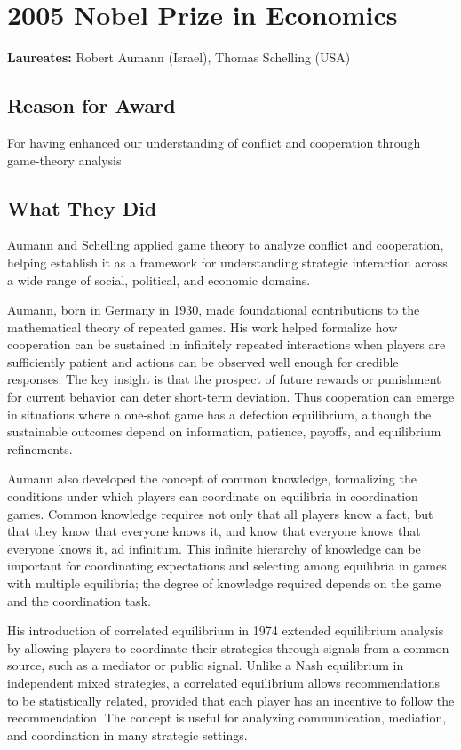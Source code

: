 \chapter{2005 Nobel Prize in Economics}
\textbf{Laureates: }Robert Aumann (Israel), Thomas Schelling (USA)

\section*{Reason for Award}
For having enhanced our understanding of conflict and cooperation through
game-theory analysis

\section{What They Did}
Aumann and Schelling applied game theory to analyze conflict and cooperation,
helping establish it as a framework for understanding strategic interaction
across a wide range of social, political, and economic domains.

Aumann, born in Germany in 1930, made foundational contributions to the
mathematical theory of repeated games. His work helped formalize how cooperation
can be sustained in infinitely repeated interactions when players are
sufficiently patient and actions can be observed well enough for credible
responses. The key insight is that the prospect of future rewards or punishment
for current behavior can deter short-term deviation. Thus cooperation can emerge
in situations where a one-shot game has a defection equilibrium, although the
sustainable outcomes depend on information, patience, payoffs, and equilibrium
refinements.

Aumann also developed the concept of common knowledge, formalizing the
conditions under which players can coordinate on equilibria in coordination
games. Common knowledge requires not only that all players know a fact, but
that they know that everyone knows it, and know that everyone knows that
everyone knows it, ad infinitum. This infinite hierarchy of knowledge can be
important for coordinating expectations and selecting among equilibria in
games with multiple equilibria; the degree of knowledge required depends on the
game and the coordination task.

His introduction of correlated equilibrium in 1974 extended equilibrium analysis
by allowing players to coordinate their strategies through signals from a common
source, such as a mediator or public signal. Unlike a Nash equilibrium in
independent mixed strategies, a correlated equilibrium allows recommendations to
be statistically related, provided that each player has an incentive to follow
the recommendation. The concept is useful for analyzing communication,
mediation, and coordination in many strategic settings.

